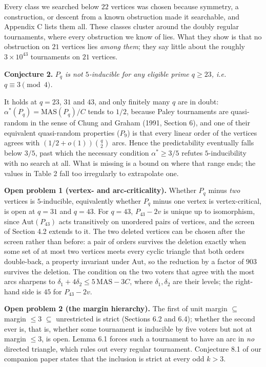 \documentclass[
]{article}
\begin{document}
Every class we searched below \(22\) vertices was chosen because
symmetry, a construction, or descent from a known obstruction made it
searchable, and Appendix C lists them all. These classes cluster around
the doubly regular tournaments, where every obstruction we know of lies.
What they show is that no obstruction on \(21\) vertices lies
\emph{among them}; they say little about the roughly
\(3 \times 10^{43}\) tournaments on \(21\) vertices.

\textbf{Conjecture 2.} \emph{\(P_{q}\) is not \(5\)-inducible for any
eligible prime \(q \ge 23\), i.e.~\(q \equiv 3 \pmod 4\).}

It holds at \(q = 23\), \(31\) and \(43\), and only finitely many \(q\)
are in doubt: \(\alpha^{*}(P_q) = \mathrm{MAS}(P_q)/C\) tends to
\(1/2\), because Paley tournaments are quasi-random in the sense of
Chung and Graham (1991, Section 6), and one of their equivalent
quasi-random properties (\(P_9\)) is that every linear order of the
vertices agrees with \((1/2 + o(1))\binom{q}{2}\) arcs. Hence the
predictability eventually falls below \(3/5\), past which the necessary
condition \(\alpha^{*} \ge 3/5\) refutes \(5\)-inducibility with no
search at all. What is missing is a bound on where that range ends; the
values in Table 2 fall too irregularly to extrapolate one.

\textbf{Open problem 1 (vertex- and arc-criticality).} Whether \(P_{q}\)
minus \emph{two} vertices is \(5\)-inducible, equivalently whether
\(P_{q}\) minus one vertex is vertex-critical, is open at \(q = 31\) and
\(q = 43\). For \(q = 43\), \(P_{43} - 2v\) is unique up to isomorphism,
since \(\mathrm{Aut}(P_{43})\) acts transitively on unordered pairs of
vertices, and the screen of Section 4.2 extends to it. The two deleted
vertices can be chosen after the screen rather than before: a pair of
orders survives the deletion exactly when some set of at most two
vertices meets every cyclic triangle that both orders double-back, a
property invariant under \(\mathrm{Aut}\), so the reduction by a factor
of \(903\) survives the deletion. The condition on the two voters that
agree with the most arcs sharpens to
\(\delta_1 + 4 \delta_2 \le 5\,\mathrm{MAS} - 3C\), where
\(\delta_1, \delta_2\) are their levels; the right-hand side is \(45\)
for \(P_{43} - 2v\).

\textbf{Open problem 2 (the margin hierarchy).} The first of unit margin
\(\subseteq\) margin \(\le 3\) \(\subseteq\) unrestricted is strict
(Sections 6.2 and 6.4); whether the second ever is, that is, whether
some tournament is inducible by five voters but not at margin \(\le 3\),
is open. Lemma 6.1 forces such a tournament to have an arc in \emph{no}
directed triangle, which rules out every regular tournament. Conjecture
8.1 of our companion paper states that the inclusion is strict at every
odd \(k > 3\).
\end{document}
